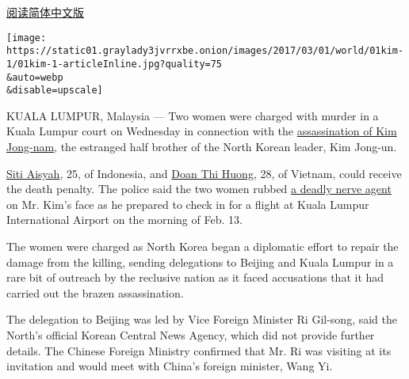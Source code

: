 \href{http://cn.nytimes3xbfgragh.onion/asia-pacific/20170301/north-korea-kim-jong-nam-death/dual/}{阅读简体中文版}

\texttt{[image: https://static01.graylady3jvrrxbe.onion/images/2017/03/01/world/01kim-1/01kim-1-articleInline.jpg?quality=75\\\&auto=webp\\\&disable=upscale]}

KUALA LUMPUR, Malaysia --- Two women were charged with murder in a Kuala
Lumpur court on Wednesday in connection with the
\href{https://www.nytimes3xbfgragh.onion/2017/02/22/world/asia/kim-jong-nam-assassination-korea-malaysia.html?rref=collection\%2Fsectioncollection\%2Fasia\&action=click\&contentCollection=asia\&region=stream\&module=stream_unit\&version=latest\&contentPlacement=26\&pgtype=sectionfront}{assassination
of Kim Jong-nam}, the estranged half brother of the North Korean leader,
Kim Jong-un.

\href{https://www.nytimes3xbfgragh.onion/2017/02/25/world/asia/north-korea-kim-jong-nam-vx-nerve-agent-siti-aisyah.html?rref=collection\%2Fsectioncollection\%2Fasia\&action=click\&contentCollection=asia\&region=stream\&module=stream_unit\&version=latest\&contentPlacement=1\&pgtype=sectionfront}{Siti
Aisyah}, 25, of Indonesia, and
\href{https://www.nytimes3xbfgragh.onion/2017/02/24/world/asia/kim-jong-nam-suspect-doan-thi-huong.html?rref=collection\%2Fsectioncollection\%2Fasia\&action=click\&contentCollection=asia\&region=stream\&module=stream_unit\&version=latest\&contentPlacement=9\&pgtype=sectionfront}{Doan
Thi Huong}, 28, of Vietnam, could receive the death penalty. The police
said the two women rubbed
\href{https://www.nytimes3xbfgragh.onion/2017/02/24/world/asia/north-korea-kim-jong-nam-vx-nerve-agent.html?rref=collection\%2Fsectioncollection\%2Fasia\&action=click\&contentCollection=asia\&region=stream\&module=stream_unit\&version=latest\&contentPlacement=7\&pgtype=sectionfront}{a
deadly nerve agent} on Mr. Kim's face as he prepared to check in for a
flight at Kuala Lumpur International Airport on the morning of Feb. 13.

The women were charged as North Korea began a diplomatic effort to
repair the damage from the killing, sending delegations to Beijing and
Kuala Lumpur in a rare bit of outreach by the reclusive nation as it
faced accusations that it had carried out the brazen assassination.

The delegation to Beijing was led by Vice Foreign Minister Ri Gil-song,
said the North's official Korean Central News Agency, which did not
provide further details. The Chinese Foreign Ministry confirmed that Mr.
Ri was visiting at its invitation and would meet with China's foreign
minister, Wang Yi.

